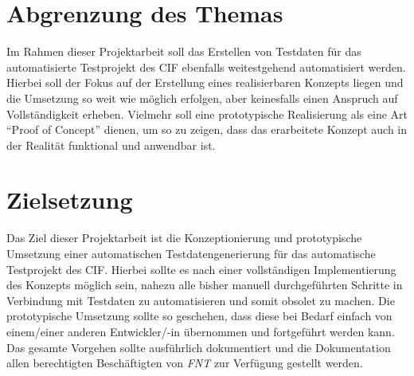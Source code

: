 \section{Abgrenzung des Themas}\label{sec:abgrenzung}
Im Rahmen dieser Projektarbeit soll das Erstellen von Testdaten für das automatisierte Testprojekt des \ac{CIF} ebenfalls weitestgehend automatisiert werden. Hierbei soll der Fokus auf der Erstellung eines realisierbaren Konzepts liegen und die Umsetzung so weit wie möglich erfolgen, aber keinesfalls einen Anspruch auf Vollständigkeit erheben. Vielmehr soll eine prototypische Realisierung als eine Art \enquote{Proof of Concept} dienen, um so zu zeigen, dass das erarbeitete Konzept auch in der Realität funktional und anwendbar ist. \cite{oed:2021}

\section{Zielsetzung}\label{sec:zielsetzung}
Das Ziel dieser Projektarbeit ist die Konzeptionierung und prototypische Umsetzung einer automatischen Testdatengenerierung für das automatische Testprojekt des \ac{CIF}. Hierbei sollte es nach einer vollständigen Implementierung des Konzepts möglich sein, nahezu alle bisher manuell durchgeführten Schritte in Verbindung mit Testdaten zu automatisieren und somit obsolet zu machen. Die prototypische Umsetzung sollte so geschehen, dass diese bei Bedarf einfach von einem/einer anderen Entwickler/-in übernommen und fortgeführt werden kann. Das gesamte Vorgehen sollte ausführlich dokumentiert und die Dokumentation allen berechtigten Beschäftigten von \textit{FNT} zur Verfügung gestellt werden.